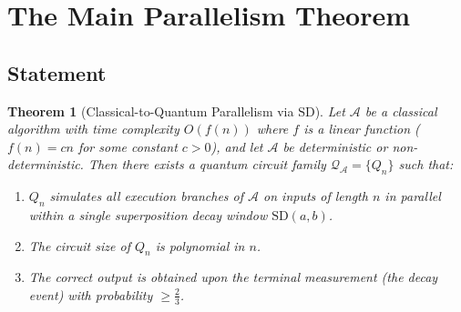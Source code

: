 \documentclass[12pt, a4paper]{article}
\theoremstyle{plain}
\newtheorem{theorem}{Theorem}[section]
\theoremstyle{definition}
\theoremstyle{remark}
\newcommand{\SD}{\ensuremath{\mathrm{SD}}}   %
\newcommand{\QC}{\ensuremath{\mathcal{Q}}}   %
\begin{document}
\section{The Main Parallelism Theorem}
\label{sec:parallel}

\subsection{Statement}

\begin{theorem}[Classical-to-Quantum Parallelism via \SD]
  \label{thm:main}
  Let $\mathcal{A}$ be a classical algorithm with time complexity $O(f(n))$
  where $f$ is a linear function ($f(n) = cn$ for some constant $c > 0$),
  and let $\mathcal{A}$ be deterministic or non-deterministic.  Then there
  exists a quantum circuit family $\QC_{\mathcal{A}} = \{Q_n\}$ such that:
  \begin{enumerate}
    \item $Q_n$ simulates all execution branches of $\mathcal{A}$ on inputs
          of length $n$ in \emph{parallel} within a single superposition decay
          window $\SD(a, b)$.
    \item The circuit size of $Q_n$ is polynomial in $n$.
    \item The correct output is obtained upon the terminal measurement (the
          decay event) with probability $\geq \tfrac{2}{3}$.
  \end{enumerate}
\end{theorem}
\end{document}
